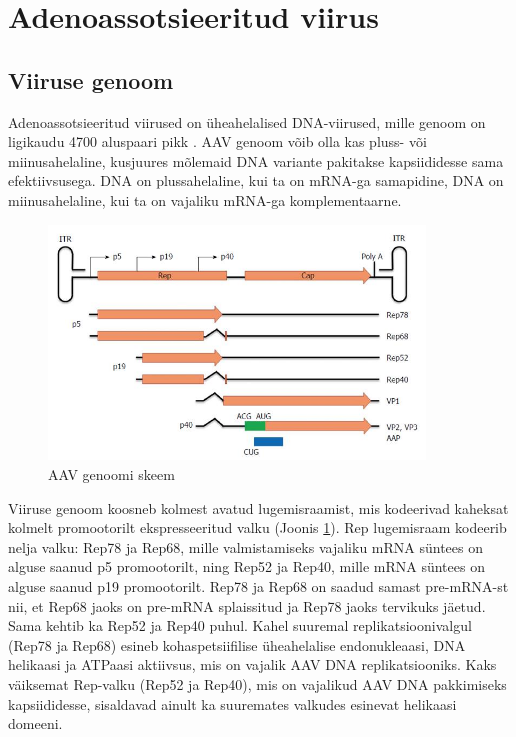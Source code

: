 \documentclass{trkut}%
\begin{document}
\section{Adenoassotsieeritud viirus}

\subsection{Viiruse genoom}

Adenoassotsieeritud viirused on üheahelalised DNA-viirused, mille genoom on ligikaudu 4700 aluspaari pikk \parencite{pupo}. AAV genoom võib olla kas pluss- või miinusahelaline, kusjuures mõlemaid DNA variante pakitakse kapsiididesse sama efektiivsusega. \parencite{plusjamin} DNA on plussahelaline, kui ta on mRNA-ga samapidine, DNA on miinusahelaline, kui ta on vajaliku mRNA-ga komplementaarne. \parencite{oxford}


\begin{figure}[htbp]
	\includegraphics[width=10cm]{genoom.jpg}
	\caption{AAV genoomi skeem}
	\label{aavgenoom}
\end{figure}
 
Viiruse genoom koosneb kolmest avatud lugemisraamist, mis kodeerivad kaheksat kolmelt promootorilt ekspresseeritud valku (Joonis \ref{aavgenoom}). Rep lugemisraam kodeerib nelja valku: Rep78 ja Rep68, mille valmistamiseks vajaliku mRNA süntees on alguse saanud p5 promootorilt, ning Rep52 ja Rep40, mille mRNA süntees on alguse saanud p19 promootorilt. Rep78 ja Rep68 on saadud samast pre-mRNA-st nii, et Rep68 jaoks on pre-mRNA splaissitud ja Rep78 jaoks tervikuks jäetud. Sama kehtib ka Rep52 ja Rep40 puhul. Kahel suuremal replikatsioonivalgul (Rep78 ja Rep68) esineb kohaspetsiifilise üheahelalise endonukleaasi, DNA helikaasi ja ATPaasi aktiivsus, mis on vajalik AAV DNA replikatsiooniks. Kaks väiksemat Rep-valku (Rep52 ja Rep40), mis on vajalikud AAV DNA pakkimiseks kapsiididesse, sisaldavad ainult ka suuremates valkudes esinevat helikaasi domeeni. \parencite{samulski}
\end{document}
